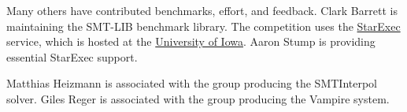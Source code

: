 \documentclass[12pt]{article}
\begin{document}
Many others have contributed benchmarks, effort, and feedback.  Clark
Barrett is maintaining the SMT-LIB benchmark library.  The competition
uses the \href{https://www.starexec.org/}{StarExec} service, which is
hosted at the \href{http://www.cs.uiowa.edu/}{University of Iowa}.
Aaron Stump is providing essential StarExec support.

%
Matthias Heizmann is associated with the group producing the
SMTInterpol solver.  Giles Reger is associated with the group
producing the Vampire system.





\end{document}
